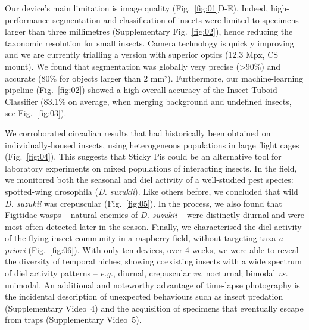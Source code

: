 \documentclass[fleqn,10pt]{wlscirep}
\begin{document}
Our device’s main limitation is image quality (Fig.~\ref{fig:01}D-E). Indeed, high-performance segmentation and classification of insects were limited to specimens larger than three millimetres (Supplementary Fig.~\ref{fig:02}), hence reducing the taxonomic resolution for small insects. Camera technology is quickly improving and we are currently trialling a version with superior optics (12.3 Mpx, CS mount). We found that segmentation was globally very precise (>90\%) and accurate (80\% for objects larger than 2 mm²). Furthermore, our machine-learning pipeline (Fig.~\ref{fig:02}) showed a high overall accuracy of the Insect Tuboid Classifier (83.1\% on average, when merging background and undefined insects, see Fig.~\ref{fig:03}). 

We corroborated circadian results that had historically been obtained on individually-housed insects, using heterogeneous populations in large flight cages (Fig.~\ref{fig:04}). This suggests that Sticky Pis could be an alternative tool for laboratory experiments on mixed populations of interacting insects. In the field, we monitored both the seasonal and diel activity of a well-studied pest species: spotted-wing drosophila (\emph{D. suzukii}). Like others before\cite{swoboda-bhattarai_diurnal_2020}, we concluded that wild \emph{D. suzukii} was crepuscular (Fig.~\ref{fig:05}). In the process, we also found that Figitidae wasps – natural enemies of \emph{D. suzukii} – were distinctly diurnal and were most often detected later in the season. Finally, we characterised the diel activity of the flying insect community in a raspberry field, without targeting taxa \emph{a priori} (Fig.~\ref{fig:06}). With only ten devices, over 4 weeks, we were able to reveal the diversity of temporal niches; showing coexisting insects with a wide spectrum of diel activity patterns – \emph{e.g.}, diurnal, crepuscular \emph{vs.} nocturnal; bimodal \emph{vs.} unimodal. An additional and noteworthy advantage of time-lapse photography is the incidental description of unexpected behaviours such as insect predation (Supplementary Video~4) and the acquisition of specimens that eventually escape from traps  (Supplementary Video~5).
\end{document}

